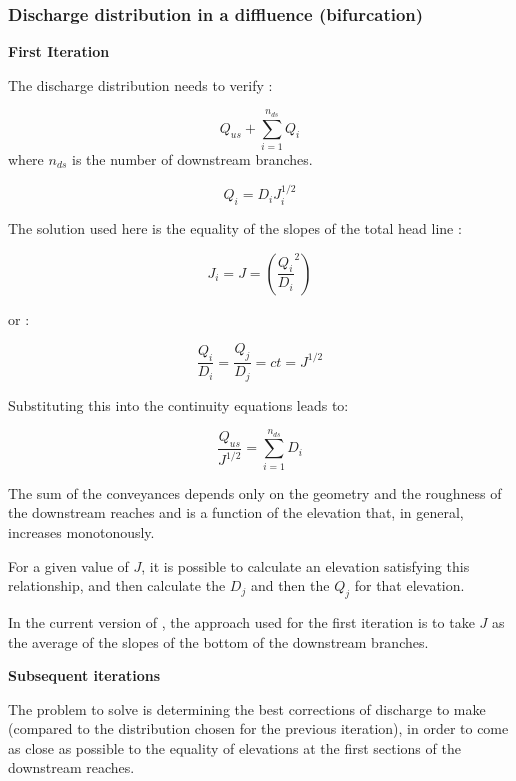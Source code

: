 \subsubsection{Discharge distribution in a diffluence (bifurcation)}

\textbf{First Iteration}

The discharge distribution needs to verify :

\begin{equation}
  Q_{us} + \sum_{i=1}^{n_{ds}} Q_i
\end{equation}
where $n_{ds}$ is the number of downstream branches.

\begin{equation}
  Q_i = D_i J_{i}^{1/2}
\end{equation}

The solution used here is the equality of the slopes of the total head line :

\begin{equation}
  J_i = J = \left ( \frac{Q_i}{D_i}^2 \right )
\end{equation}

or :

\begin{equation}
  \frac{Q_i}{D_i} = \frac{Q_j}{D_j} = ct = J^{1/2}
\end{equation}

Substituting this into the continuity equations leads to:

\begin{equation}
 \frac{Q_{us}}{J^{1/2}} = \sum_{i=1}^{n_{ds}} D_i
\end{equation}

The sum of the conveyances depends only on the geometry and the roughness of the downstream reaches and is a function of the elevation that, in general, increases monotonously.

For a given value of $J$, it is possible to calculate an elevation satisfying this relationship, and then calculate the $D_j$ and then the  $Q_j$ for that elevation.

In the current version of \mascaret{}, the approach used for the first iteration is to take $J$ as the average of the slopes of the bottom of the downstream branches.

\textbf{Subsequent iterations}

The problem to solve is determining the best corrections of discharge to make (compared to the distribution chosen for the previous iteration), in order to come as close as possible to the equality of elevations at the first sections of the downstream reaches.

